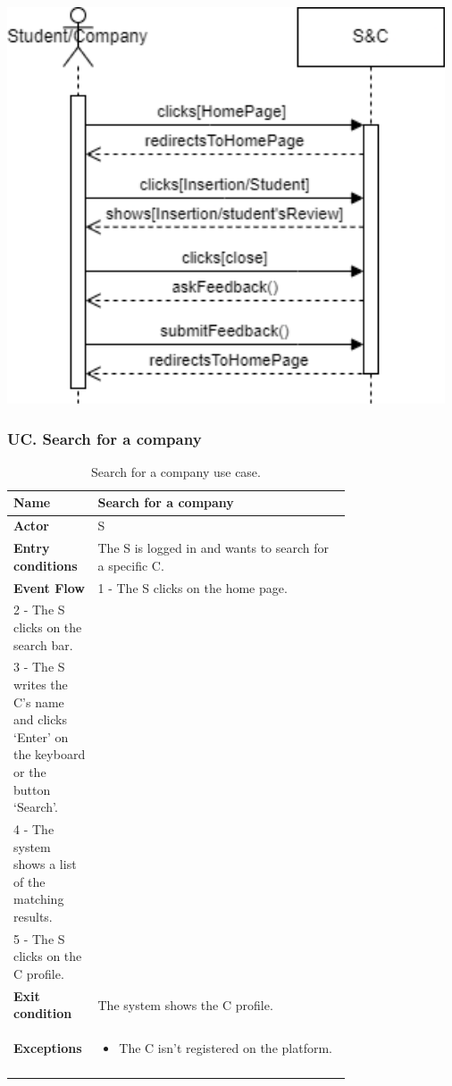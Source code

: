 \includegraphics[width=5.11111in,height=4.625in]{Images/image4.png}

\subsubsection*{UC\cuc . Search for a company}
\begin{center}
    \begin{longtable}{|l|p{0.75\linewidth}|}
        \hline
        \textbf{Name}               & Search for a company\\
        \hline
        \textbf{Actor}              & S\\
        \hline
        \textbf{Entry conditions}   & The S is logged in and wants to search for a specific C.\\
        \hline
        \textbf{Event Flow}         & 
        1 - The S clicks on the home page. \\
        2 - The S clicks on the search bar. \\
        3 - The S writes the C’s name and clicks ‘Enter’ on the keyboard or the button ‘Search’. \\
        4 - The system shows a list of the matching results. \\
        5 - The S clicks on the C profile. \\
        \hline
        \textbf{Exit condition}   & The system shows the C profile. \\       
        \hline
        \textbf{Exceptions}       & \begin{itemize}
            \item The C isn’t registered on the platform.
        \end{itemize}\\
        \hline
        \caption{Search for a company use case.}
        \label{tab: search_for_a_company_use_case}
    \end{longtable}
\end{center}


